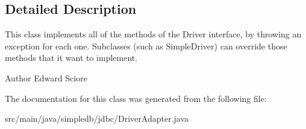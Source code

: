 \subsection{Detailed Description}
This class implements all of the methods of the Driver interface, by throwing an exception for each one. Subclasses (such as Simple\+Driver) can override those methods that it want to implement. \begin{DoxyAuthor}{Author}
Edward Sciore 
\end{DoxyAuthor}


The documentation for this class was generated from the following file\+:\begin{DoxyCompactItemize}
\item 
src/main/java/simpledb/jdbc/Driver\+Adapter.\+java\end{DoxyCompactItemize}
